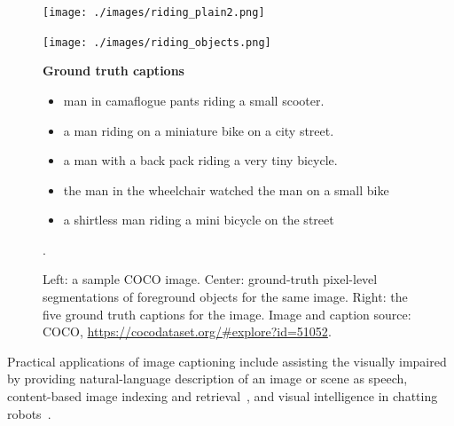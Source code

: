 \documentclass[english,twoside,openright]{HYgraduMLDS}
\begin{document}
\begin{figure}
    \centering
    \begin{minipage}[t]{0.3\textwidth}
	    \vspace{0pt}
        \centering
        \texttt{[image: ./images/riding\_plain2.png]}
    \end{minipage}\hfill
    \begin{minipage}[t]{0.3\textwidth}
	    \vspace{0pt}
        \centering
        \texttt{[image: ./images/riding\_objects.png]}
    \end{minipage}
    \begin{minipage}[t]{0.35\textwidth}
	    \vspace{0pt}
        \footnotesize \textbf{Ground truth captions}
        \begin{itemize}[leftmargin=0.5cm]
        \item man in camaflogue pants riding a small scooter.
        \item a man riding on a miniature bike on a city street.
        \item a man with a back pack riding a very tiny bicycle.
        \item the man in the wheelchair watched the man on a small bike
        \item a shirtless man riding a mini bicycle on the street
        \end{itemize}
    \end{minipage}
    \caption{Left: a sample COCO image. Center: ground-truth pixel-level segmentations of foreground objects for the same image. Right: the five ground truth captions for the image. Image and caption source: COCO, \url{https://cocodataset.org/\#explore?id=51052}.}.
    \label{fig:coco_caption_example}
\end{figure}

Practical applications of image captioning include assisting the visually impaired by providing natural-language description of an image or scene as speech, content-based image indexing and retrieval~\cite{SurveyDL}, and visual intelligence in chatting robots~\cite{StyleNet}.
\end{document}
